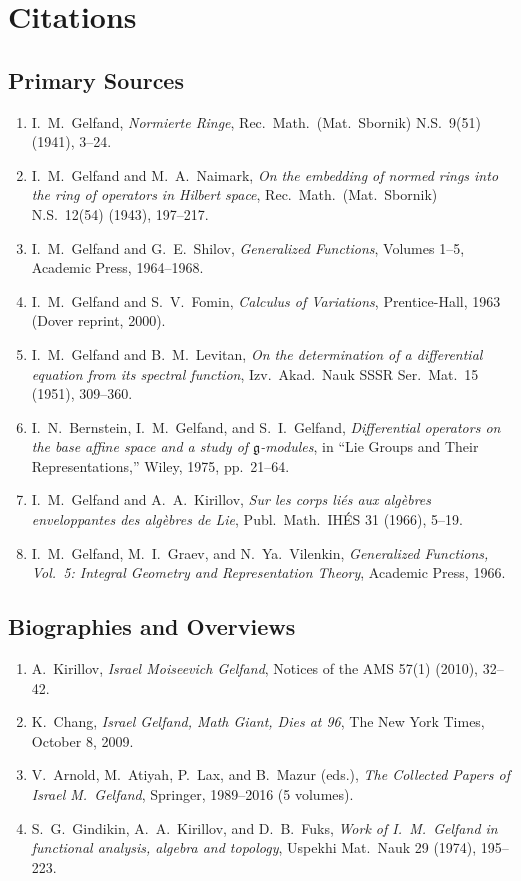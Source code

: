 \section{Citations}\subsection*{Primary Sources}
\begin{enumerate}
    \item I.\ M.\ Gelfand, \textit{Normierte Ringe}, Rec.\ Math.\ (Mat.\ Sbornik) N.S.\ 9(51) (1941), 3--24.
    \item I.\ M.\ Gelfand and M.\ A.\ Naimark, \textit{On the embedding of normed rings into the ring of operators in Hilbert space}, Rec.\ Math.\ (Mat.\ Sbornik) N.S.\ 12(54) (1943), 197--217.
    \item I.\ M.\ Gelfand and G.\ E.\ Shilov, \textit{Generalized Functions}, Volumes 1--5, Academic Press, 1964--1968.
    \item I.\ M.\ Gelfand and S.\ V.\ Fomin, \textit{Calculus of Variations}, Prentice-Hall, 1963 (Dover reprint, 2000).
    \item I.\ M.\ Gelfand and B.\ M.\ Levitan, \textit{On the determination of a differential equation from its spectral function}, Izv.\ Akad.\ Nauk SSSR Ser.\ Mat.\ 15 (1951), 309--360.
    \item I.\ N.\ Bernstein, I.\ M.\ Gelfand, and S.\ I.\ Gelfand, \textit{Differential operators on the base affine space and a study of $\mathfrak{g}$-modules}, in ``Lie Groups and Their Representations,'' Wiley, 1975, pp.\ 21--64.
    \item I.\ M.\ Gelfand and A.\ A.\ Kirillov, \textit{Sur les corps li\'{e}s aux alg\`ebres enveloppantes des alg\`ebres de Lie}, Publ.\ Math.\ IH\'{E}S 31 (1966), 5--19.
    \item I.\ M.\ Gelfand, M.\ I.\ Graev, and N.\ Ya.\ Vilenkin, \textit{Generalized Functions, Vol.\ 5: Integral Geometry and Representation Theory}, Academic Press, 1966.
\end{enumerate}

\subsection*{Biographies and Overviews}
\begin{enumerate}
    \item A.\ Kirillov, \textit{Israel Moiseevich Gelfand}, Notices of the AMS 57(1) (2010), 32--42.
    \item K.\ Chang, \textit{Israel Gelfand, Math Giant, Dies at 96}, The New York Times, October 8, 2009.
    \item V.\ Arnold, M.\ Atiyah, P.\ Lax, and B.\ Mazur (eds.), \textit{The Collected Papers of Israel M.\ Gelfand}, Springer, 1989--2016 (5 volumes).
    \item S.\ G.\ Gindikin, A.\ A.\ Kirillov, and D.\ B.\ Fuks, \textit{Work of I.\ M.\ Gelfand in functional analysis, algebra and topology}, Uspekhi Mat.\ Nauk 29 (1974), 195--223.
\end{enumerate}

